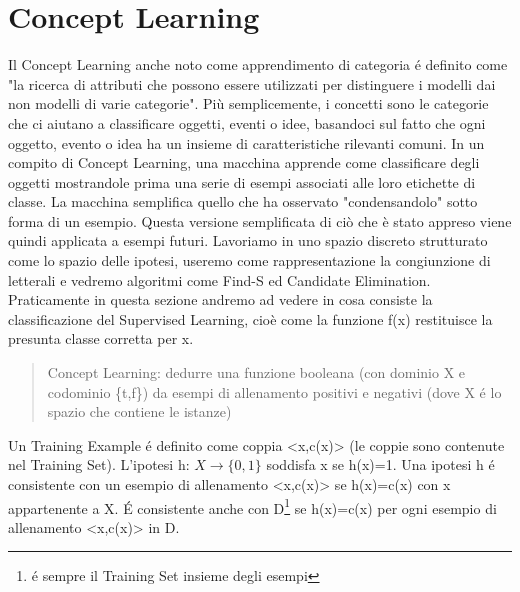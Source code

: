 \documentclass{article}
\begin{document}
\section{Concept Learning}
Il Concept Learning anche noto come apprendimento di categoria é definito come "la ricerca di attributi che possono essere utilizzati per distinguere i modelli dai non modelli di varie categorie". Più semplicemente, i concetti sono le categorie che ci aiutano a classificare oggetti, eventi o idee, basandoci sul fatto che ogni oggetto, evento o idea ha un insieme di caratteristiche rilevanti comuni. In un compito di Concept Learning, una macchina apprende come classificare degli oggetti mostrandole prima una serie di esempi associati alle loro etichette di classe. La macchina semplifica quello che ha osservato "condensandolo" sotto forma di un esempio. Questa versione semplificata di ciò che è stato appreso viene quindi applicata a esempi futuri. \newline
Lavoriamo in uno spazio discreto strutturato come lo spazio delle ipotesi, useremo come rappresentazione la congiunzione di letterali e vedremo algoritmi come Find-S ed Candidate Elimination. Praticamente in questa sezione andremo ad vedere in cosa consiste la classificazione del Supervised Learning, cioè come la funzione f(x) restituisce la presunta classe corretta per x.

\begin{quote}
    Concept Learning: dedurre una funzione booleana (con dominio X e codominio \{t,f\}) da esempi di allenamento positivi e negativi (dove X é lo spazio che contiene le istanze)
\end{quote}
Un Training Example é definito come coppia <x,c(x)> (le coppie sono contenute nel Training Set). \newline
L'ipotesi h: $X \rightarrow \{0,1\}$ soddisfa x se h(x)=1. \newline
Una ipotesi h é consistente con un esempio di allenamento <x,c(x)> se h(x)=c(x) con x appartenente a X. É consistente anche con D\footnote{é sempre il Training Set insieme degli esempi} se h(x)=c(x) per ogni esempio di allenamento <x,c(x)> in D.
\clearpage
\end{document}
